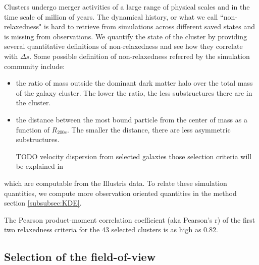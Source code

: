 Clusters undergo merger activities of a large range of physical scales and 
in the time scale of million of years. 
The dynamical history, or what we call ``non-relaxedness" is hard to retrieve from 
simulations across different saved states and is missing from observations.
We quantify the state of the cluster by providing several quantitative
definitions of non-relaxedness and see how they correlate with $\Delta s$.
Some possible definition of non-relaxedness referred by the simulation community
include:
\begin{itemize}
	\item the ratio of mass outside the dominant dark matter halo over the total mass
		of the galaxy cluster. The lower the ratio, the less substructures there
		are in the cluster. 
	\item the distance between the most bound particle from the center of mass as a
		function of $R_{200c}$. The smaller the distance, there are less asymmetric 
		substructures. 
	\item [TODO] velocity dispersion from selected galaxies those selection
		criteria will be explained in  
\end{itemize}
which are computable from the Illustris data. 
To relate these simulation quantities, we compute more observation oriented 
quantities in the method section \ref{subsubsec:KDE}. 

The Pearson product-moment correlation coefficient
(aka Pearson's r) of the first
two relaxedness criteria for the 43 selected clusters is as high as 0.82. 

\subsection{Selection of the field-of-view}
\label{sec:FOV}

